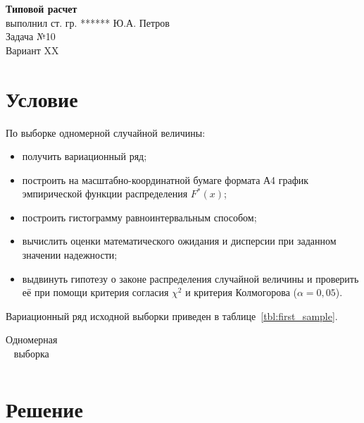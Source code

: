 \documentclass[14pt,hidelinks]{extarticle}
\begin{document}


\begin{center}
	\textbf{Типовой расчет} \\ 
	выполнил ст. гр. ****** Ю.А. Петров \\
        Задача №10\\
	Вариант XX 
\end{center}

\section{Условие}

По выборке одномерной случайной величины:

\begin{itemize}
	\item получить вариационный ряд;
	\item построить на масштабно-координатной бумаге формата А4 график эмпирической функции распределения $ F^*(x) $; 
	\item построить гистограмму равноинтервальным способом;
	\item вычислить оценки математического ожидания и дисперсии при заданном значении надежности;
	\item выдвинуть гипотезу о законе распределения случайной величины и проверить её при помощи критерия согласия $ \chi^2 $ и критерия Колмогорова ($ \alpha = 0,05 $).
\end{itemize}

Вариационный ряд исходной выборки приведен в таблице~\ref{tbl:first_sample}.

\renewcommand{\tabcolsep}{0.6em} 
\begin{table}[h!]
	\centering
	\caption{Одномерная выборка\label{tbl:first_sample}}
	\label{tbl:first}
	\begin{tabular}{cccccccccc}
		
	\end{tabular}
\end{table}

\newpage

\section{Решение}
\end{document}
